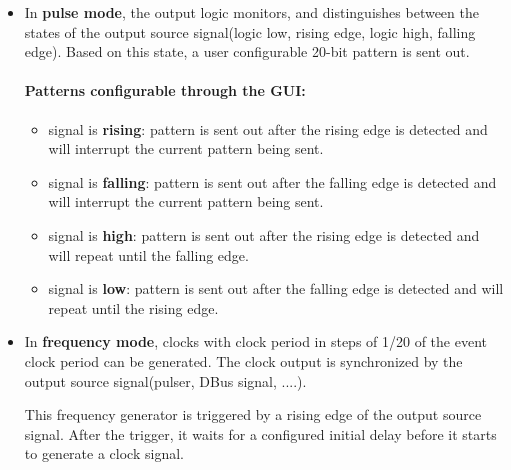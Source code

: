 \documentclass[12pt,a4paper]{article}
\begin{document}
\begin{itemize}
\item 
	In \textbf{pulse mode}, the output logic monitors, and distinguishes between the states of the output source signal(logic low, rising edge, logic high, falling edge). Based on this state, a user configurable 20-bit pattern is sent out.
	
	\paragraph{Patterns configurable through the GUI:}
	\begin{itemize}
	\item
	  signal is \textbf{rising}: pattern is sent out
	  after the rising edge is detected and will interrupt the current
	  pattern being sent.
	\item
	  signal is \textbf{falling}: pattern is sent out
	  after the falling edge is detected and will interrupt the current
	  pattern being sent.
	\item
	  signal is \textbf{high}: pattern is sent out after
	  the rising edge is detected and will repeat until the falling edge.
	\item
	  signal is \textbf{low}: pattern is sent out after
	  the falling edge is detected and will repeat until the rising edge.
	\end{itemize}
\item 
	In \textbf{frequency mode}, clocks with clock period in steps of 1/20 of the event clock period can be generated. The clock output is synchronized by the output source signal(pulser, DBus signal, ....). 
	
	This frequency generator is triggered by a rising edge of the output source signal. After the trigger, it waits for a configured initial delay before it starts to generate a clock signal. 
		

\end{itemize}
\end{document}
